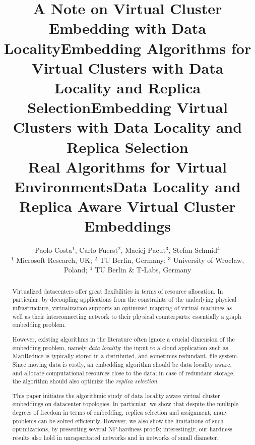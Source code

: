 \documentclass[9pt]{sigcomm-alternate}
\title{A Note on Virtual Cluster Embedding with Data Locality}
\title{Embedding Algorithms for Virtual Clusters with Data Locality and Replica Selection}
\title{Embedding Virtual Clusters with Data Locality and Replica Selection\\{\Large Real Algorithms for Virtual Environments}}
\title{Data Locality and Replica Aware Virtual Cluster Embeddings}
\author{Paolo Costa$^1$, Carlo Fuerst$^2$, Maciej Pacut$^3$, Stefan Schmid$^4$\\
{\small $^1$ Microsoft Research, UK; $^2$ TU Berlin, Germany; $^3$ University of Wroclaw, Poland; $^4$ TU Berlin \& T-Labs, Germany}}
\begin{document}
\maketitle

\sloppy

\begin{abstract}
Virtualized datacenters offer great flexibilities in terms of resource allocation. In particular, by
decoupling applications from the constraints of the underlying physical infrastructure, virtualization
supports an optimized mapping of virtual machines as well as their interconnecting network
to their
physical counterparts: essentially a graph embedding problem.

However, existing algorithms
in the literature often ignore a crucial dimension of the embedding problem, namely \emph{data locality}:
the input to a cloud application such as MapReduce is typically stored in a distributed,
and sometimes redundant, file system. Since moving
data is costly, an embedding algorithm should be data locality aware,
and allocate computational resources close to the data; in case of redundant storage, the algorithm should also optimize the \emph{replica selection}.

This paper initiates the algorithmic study of data locality aware virtual cluster embeddings
on datacenter topologies.
In particular, we
show that
despite the multiple degrees of freedom in terms of embedding, replica selection and assignment,
many problems can be
solved efficiently. However, we also show the limitations of such optimizations,
by presenting several NP-hardness proofs; interestingly,
our hardness results also hold in uncapacitated networks and in networks of small diameter.
\end{abstract}


%
\end{document}
